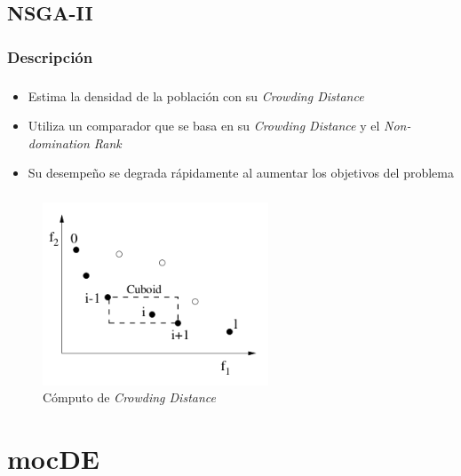 \documentclass[serif]{beamer}
\begin{document}
\subsection{NSGA-II}
\subsubsection{Descripción}
\begin{frame}
\frametitle{\insertsubsubsection}
	\begin{itemize}\setlength{\itemsep}{4mm}
		\item Estima la densidad de la población con su \emph{Crowding Distance}
		\item Utiliza un comparador que se basa en su \emph{Crowding Distance} y el \emph{Non-domination Rank}
		\item Su desempeño se degrada rápidamente al aumentar los objetivos del problema
	\end{itemize}
\end{frame}

\begin{frame}
\frametitle{\insertsubsubsection}
	\vspace*{-0.2cm}
	\begin{figure}
	\centering
	\includegraphics[width=0.6\textwidth]{crowdingdistance.png}
	\caption{Cómputo de \emph{Crowding Distance}}
	\end{figure}
\end{frame}


\section{mocDE}
\end{document}
